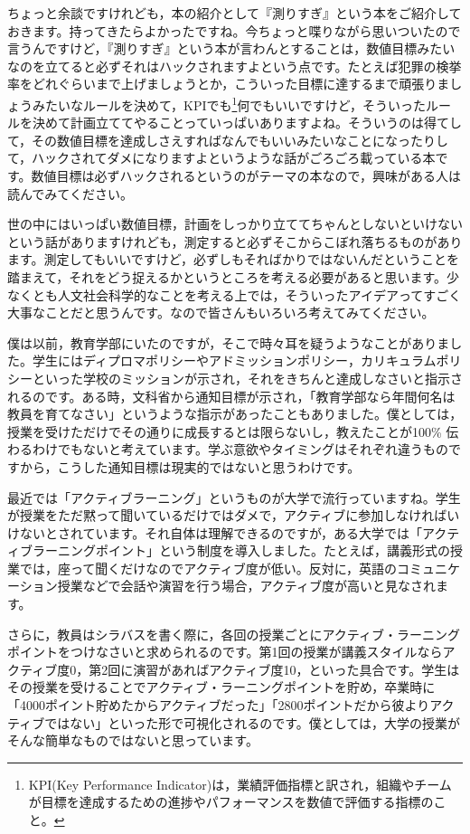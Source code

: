 \documentclass{ltjsbook}
\begin{document}
ちょっと余談ですけれども，本の紹介として『測りすぎ』という本\parencite{muller2019hakarisugi}をご紹介しておきます。持ってきたらよかったですね。今ちょっと喋りながら思いついたので言うんですけど，『測りすぎ』という本が言わんとすることは，数値目標みたいなのを立てると必ずそれはハックされますよという点です。たとえば犯罪の検挙率をどれぐらいまで上げましょうとか，こういった目標に達するまで頑張りましょうみたいなルールを決めて，KPIでも\footnote{KPI(Key Performance Indicator)は，業績評価指標と訳され，組織やチームが目標を達成するための進捗やパフォーマンスを数値で評価する指標のこと。}何でもいいですけど，そういったルールを決めて計画立ててやることっていっぱいありますよね。そういうのは得てして，その数値目標を達成しさえすればなんでもいいみたいなことになったりして，ハックされてダメになりますよというような話がごろごろ載っている本です。数値目標は必ずハックされるというのがテーマの本なので，興味がある人は読んでみてください。

世の中にはいっぱい数値目標，計画をしっかり立ててちゃんとしないといけないという話がありますけれども，測定すると必ずそこからこぼれ落ちるものがあります。測定してもいいですけど，必ずしもそればかりではないんだということを踏まえて，それをどう捉えるかというところを考える必要があると思います。少なくとも人文社会科学的なことを考える上では，そういったアイデアってすごく大事なことだと思うんです。なので皆さんもいろいろ考えてみてください。

僕は以前，教育学部にいたのですが，そこで時々耳を疑うようなことがありました。学生にはディプロマポリシーやアドミッションポリシー，カリキュラムポリシーといった学校のミッションが示され，それをきちんと達成しなさいと指示されるのです。ある時，文科省から通知目標が示され，「教育学部なら年間何名は教員を育てなさい」というような指示があったこともありました。僕としては，授業を受けただけでその通りに成長するとは限らないし，教えたことが100\% 伝わるわけでもないと考えています。学ぶ意欲やタイミングはそれぞれ違うものですから，こうした通知目標は現実的ではないと思うわけです。

最近では「アクティブラーニング」というものが大学で流行っていますね。学生が授業をただ黙って聞いているだけではダメで，アクティブに参加しなければいけないとされています。それ自体は理解できるのですが，ある大学では「アクティブラーニングポイント」という制度を導入しました。たとえば，講義形式の授業では，座って聞くだけなのでアクティブ度が低い。反対に，英語のコミュニケーション授業などで会話や演習を行う場合，アクティブ度が高いと見なされます。

さらに，教員はシラバスを書く際に，各回の授業ごとにアクティブ・ラーニングポイントをつけなさいと求められるのです。第1回の授業が講義スタイルならアクティブ度0，第2回に演習があればアクティブ度10，といった具合です。学生はその授業を受けることでアクティブ・ラーニングポイントを貯め，卒業時に「4000ポイント貯めたからアクティブだった」「2800ポイントだから彼よりアクティブではない」といった形で可視化されるのです。僕としては，大学の授業がそんな簡単なものではないと思っています。
\end{document}
